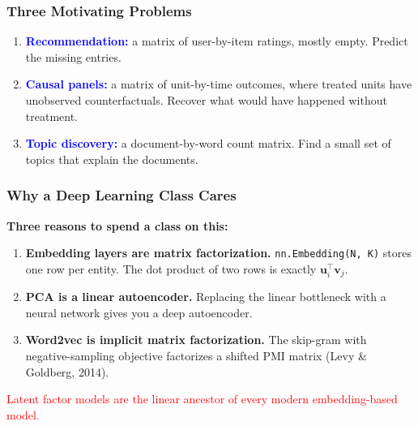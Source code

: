\documentclass[notes,11pt, aspectratio=169]{beamer}
\newcommand{\vu}{\mathbf{u}}
\newcommand{\vv}{\mathbf{v}}
\newcommand{\vU}{\mathbf{U}}
\newcommand{\vV}{\mathbf{V}}
\newcommand{\vY}{\mathbf{Y}}
\begin{document}
\begin{frame}
\frametitle{Three Motivating Problems}

\begin{enumerate}
    \item \textcolor{blue}{\textbf{Recommendation:}} a matrix of user-by-item ratings, mostly empty. Predict the missing entries.

    \vspace{6pt}
    \item \textcolor{blue}{\textbf{Causal panels:}} a matrix of unit-by-time outcomes, where treated units have unobserved counterfactuals. Recover what would have happened without treatment.

    \vspace{6pt}
    \item \textcolor{blue}{\textbf{Topic discovery:}} a document-by-word count matrix. Find a small set of topics that explain the documents.
\end{enumerate}

\vspace{12pt}
\end{frame}

\begin{frame}
\frametitle{Why a Deep Learning Class Cares}

\textbf{Three reasons to spend a class on this:}

\vspace{6pt}
\begin{enumerate}
    \item \textbf{Embedding layers are matrix factorization.} \texttt{nn.Embedding(N, K)} stores one row per entity. The dot product of two rows is exactly $\vu_i^\top \vv_j$.

    \vspace{6pt}
    \item \textbf{PCA is a linear autoencoder.} Replacing the linear bottleneck with a neural network gives you a deep autoencoder.

    \vspace{6pt}
    \item \textbf{Word2vec is implicit matrix factorization.} The skip-gram with negative-sampling objective factorizes a shifted PMI matrix (Levy \& Goldberg, 2014).
\end{enumerate}

\vspace{8pt}
\textcolor{red}{Latent factor models are the linear ancestor of every modern embedding-based model.}
\end{frame}
\end{document}
